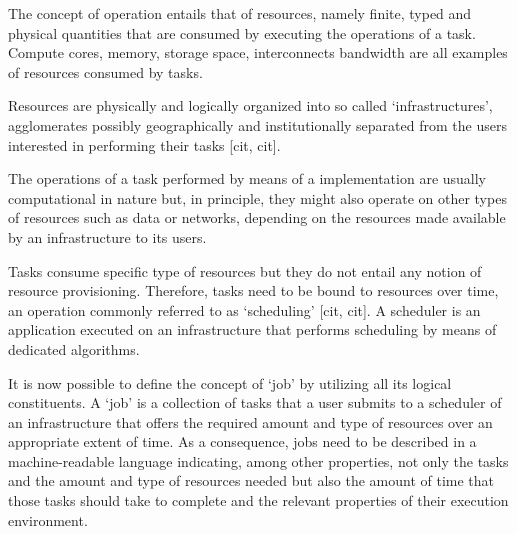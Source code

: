 \documentclass{sig-alternate}
\begin{document}

The concept of operation entails that of resources, namely finite, typed and physical quantities that are consumed by executing the operations of a task. Compute cores, memory, storage space,  interconnects bandwidth are all examples of resources consumed by tasks. 


Resources are physically and logically organized into so called `infrastructures', agglomerates possibly geographically and institutionally separated from the users interested in performing their tasks [cit, cit].


The operations of a task performed by means of a \pilotjob implementation are usually computational in nature but, in principle, they might also operate on other types of resources such as data   or networks, depending on the resources made available by an infrastructure to its users.


Tasks consume specific type of resources but they do not entail any
notion of resource provisioning. Therefore, tasks need to be bound to
resources over time, an operation commonly referred to as `scheduling'
[cit, cit]. A scheduler is an application executed on an infrastructure
that performs scheduling by means of dedicated algorithms.


It is now possible to define the concept of `job' by utilizing all its logical constituents. A `job' is a collection of tasks that a user submits to a scheduler of an infrastructure that offers the required amount and type of resources over an appropriate extent of time. 
 
As a consequence, jobs need to be described in a machine-readable language indicating, among other properties, not only the tasks and the amount and type of resources needed but also the amount of time that those tasks should take to complete and the relevant properties of their execution environment.
\end{document}
